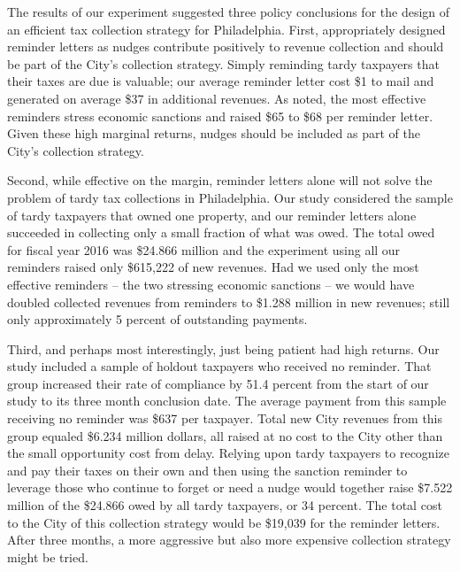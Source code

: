\documentclass[12pt]{article}
\begin{document}
The results of our experiment suggested three policy conclusions for
the design of an efficient tax collection strategy for Philadelphia.
First, appropriately designed reminder letters as nudges contribute
positively to revenue collection and should be part of the City's
collection strategy.  Simply reminding tardy taxpayers that their
taxes are due is valuable; our average reminder letter cost \$1 to
mail and generated on average \$37 in additional revenues.  As noted,
the most effective reminders stress economic sanctions and raised \$65
to \$68 per reminder letter.  Given these high marginal returns,
nudges should be included as part of the City's collection strategy.

Second, while effective on the margin, reminder letters alone will not
solve the problem of tardy tax collections in Philadelphia.  Our study
considered the sample of tardy taxpayers that owned one property, and
our reminder letters alone succeeded in collecting only a small
fraction of what was owed.  The total owed for fiscal year 2016 was
\$24.866 million and the experiment using all our reminders raised
only \$615,222 of new revenues.  Had we used only the most effective
reminders -- the two stressing economic sanctions -- we would have
doubled collected revenues from reminders to \$1.288 million in new
revenues; still only approximately 5 percent of outstanding payments.

Third, and perhaps most interestingly, just being patient had high
returns.  Our study included a sample of holdout taxpayers who
received no reminder.  That group increased their rate of compliance
by 51.4 percent from the start of our study to its three month
conclusion date. The average payment from this sample receiving no
reminder was \$637 per taxpayer.  Total new City revenues from
this group equaled \$6.234 million dollars, all raised at no cost to
the City other than the small opportunity cost from delay.  Relying
upon tardy taxpayers to recognize and pay their taxes on their own and
then using the sanction reminder to leverage those who continue to
forget or need a nudge would together raise \$7.522 million of the
\$24.866 owed by all tardy taxpayers, or 34 percent.  The total cost
to the City of this collection strategy would be \$19,039 for the
reminder letters.  After three months, a more aggressive but also more
expensive collection strategy might be tried.
\end{document}
